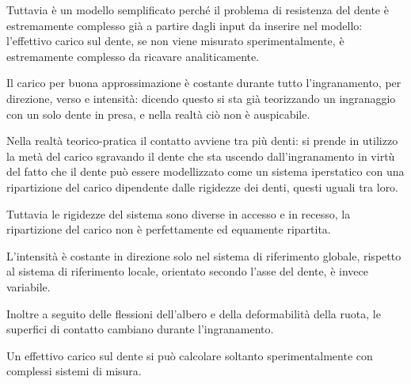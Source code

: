 \documentclass[a4paper, 15pt]{article}
\begin{document}
\begin{adjustwidth}{2in}{}
Tuttavia è un modello semplificato perché  il problema di resistenza del dente è estremamente complesso già a partire dagli input da inserire nel modello: l'effettivo carico sul dente, se non viene misurato sperimentalmente, è estremamente complesso da ricavare analiticamente. \newline

Il carico per buona approssimazione è costante durante tutto l'ingranamento, per direzione, verso e intensità: dicendo questo si sta già teorizzando un ingranaggio con un solo dente in presa, e nella realtà ciò non è auspicabile. 

Nella realtà teorico-pratica il contatto avviene tra più denti: si prende in utilizzo la metà del carico sgravando il dente che sta uscendo dall'ingranamento in virtù del fatto che il dente può essere modellizzato come un sistema iperstatico con una ripartizione del carico dipendente dalle rigidezze dei denti, questi uguali tra loro.

Tuttavia le rigidezze del sistema sono diverse in accesso e in recesso, la ripartizione del carico non è perfettamente ed equamente ripartita. \newline

L'intensità è costante in direzione solo nel sistema di riferimento globale, rispetto al sistema di riferimento locale, orientato secondo l'asse del dente, è invece variabile. \newline 

Inoltre a seguito delle flessioni dell'albero e della deformabilità della ruota, le superfici di contatto cambiano durante l'ingranamento. \newline 

Un effettivo carico sul dente si può calcolare  soltanto sperimentalmente con complessi sistemi di misura.  
\end{adjustwidth}
\end{document}
